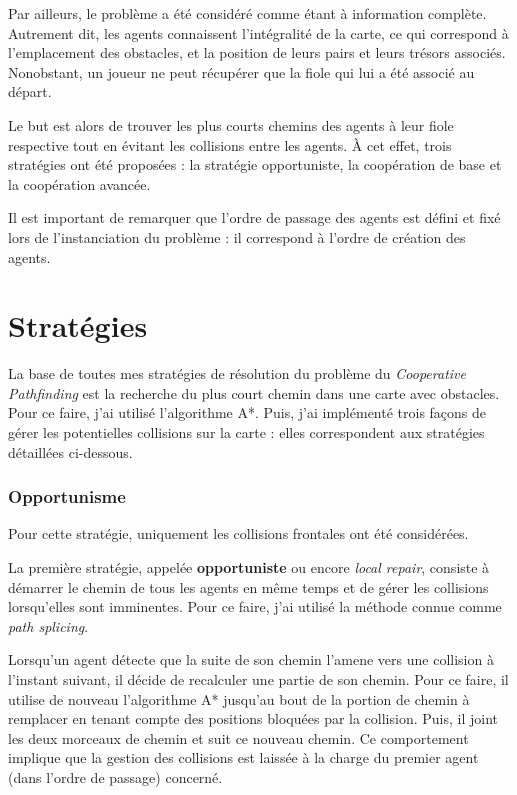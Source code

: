 \documentclass[12pt,a4paper]{article}
\begin{document}
Par ailleurs, le probl\`eme a \'et\'e consid\'er\'e comme \'etant \`a information compl\`ete. 
Autrement dit, les agents connaissent l'int\'egralit\'e de la carte, ce qui correspond \`a l'emplacement des obstacles, et la position de leurs pairs et leurs tr\'esors associ\'es.
Nonobstant, un joueur ne peut r\'ecup\'erer que la fiole qui lui a \'et\'e associ\'e au d\'epart.

Le but est alors de trouver les plus courts chemins des agents \`a leur fiole respective tout en \'evitant les collisions entre les agents.
\`A cet effet, trois strat\'egies ont \'et\'e propos\'ees : la strat\'egie opportuniste, la coop\'eration de base et la coop\'eration avanc\'ee.

Il est important de remarquer que l'ordre de passage des agents est d\'efini et fix\'e lors de l'instanciation du probl\`eme : il correspond \`a l'ordre de cr\'eation des agents.

\part{Strat\'egies}
La base de toutes mes strat\'egies de r\'esolution du probl\`eme du \textit{Cooperative Pathfinding} est la recherche du plus court chemin dans une carte avec obstacles. 
Pour ce faire, j'ai utilis\'e l'algorithme A*.
Puis, j'ai impl\'ement\'e trois fa\c{c}ons de g\'erer les potentielles collisions sur la carte : elles correspondent aux strat\'egies d\'etaill\'ees ci-dessous.

\section{Opportunisme}
Pour cette strat\'egie, uniquement les collisions frontales ont \'et\'e consid\'er\'ees.

La premi\`ere strat\'egie, appel\'ee \textbf{opportuniste} ou encore \textit{local repair}, consiste \`a d\'emarrer le chemin de tous les agents en m\^eme temps et de g\'erer les collisions lorsqu'elles sont imminentes.
Pour ce faire, j'ai utilis\'e la m\'ethode connue comme \textit{path splicing}.

Lorsqu'un agent d\'etecte que la suite de son chemin l'amene vers une collision \`a l'instant suivant, il d\'ecide de recalculer une partie de son chemin. Pour ce faire, il utilise de nouveau l'algorithme A* jusqu'au bout de la portion de chemin \`a remplacer en tenant compte des positions bloqu\'ees par la collision. Puis, il joint les deux morceaux de chemin et suit ce nouveau chemin. Ce comportement implique que la gestion des collisions est laiss\'ee \`a la charge du premier agent (dans l'ordre de passage) concern\'e.
\end{document}
